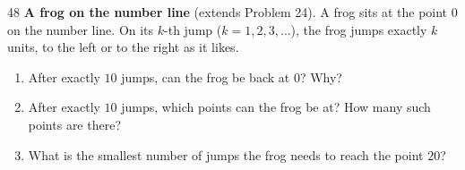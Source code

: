 \begin{probbox}{48}{}
\textbf{A frog on the number line} (extends Problem 24). A frog sits at the point $0$ on the number line. On its $k$-th jump ($k=1,2,3,\dots$), the frog jumps exactly $k$ units, to the left or to the right as it likes.
\begin{enumerate}[label=\alph*),leftmargin=1.6em,itemsep=1pt]
\item After exactly $10$ jumps, can the frog be back at $0$? Why?
\item After exactly $10$ jumps, which points can the frog be at? How many such points are there?
\item What is the smallest number of jumps the frog needs to reach the point $20$?
\end{enumerate}
\end{probbox}

